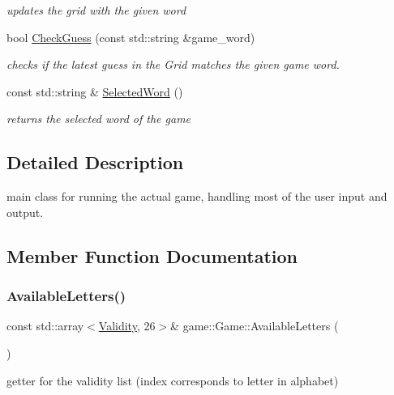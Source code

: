 \begin{DoxyCompactItemize}
\begin{DoxyCompactList}\small\item\em updates the grid with the given word \end{DoxyCompactList}\item 
bool \hyperlink{classgame_1_1Game_a73e4f12d9ffbf48573d3e9871a15fd8e}{Check\+Guess} (const std\+::string \&game\+\_\+word)
\begin{DoxyCompactList}\small\item\em checks if the latest guess in the Grid matches the given game word. \end{DoxyCompactList}\item 
const std\+::string \& \hyperlink{classgame_1_1Game_a85584931f1e9085bd8cad92d43fd2be8}{Selected\+Word} ()
\begin{DoxyCompactList}\small\item\em returns the selected word of the game \end{DoxyCompactList}\end{DoxyCompactItemize}


\subsection{Detailed Description}
main class for running the actual game, handling most of the user input and output. 

\subsection{Member Function Documentation}
\mbox{\label{classgame_1_1Game_aa2b90ae6940730e872300d2727a86f24}} 
\subsubsection{\texorpdfstring{Available\+Letters()}{AvailableLetters()}}
{\footnotesize\ttfamily const std\+::array$<$\hyperlink{Validity_8h_acb8ce664e8a953fe8c27d7f0b37cbca4}{Validity}, 26$>$\& game\+::\+Game\+::\+Available\+Letters (\begin{DoxyParamCaption}{ }\end{DoxyParamCaption})}



getter for the validity list (index corresponds to letter in alphabet) 

